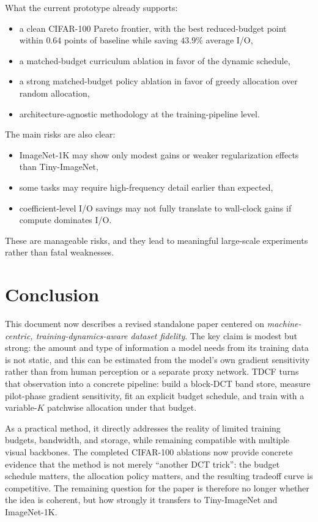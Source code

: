 \documentclass[10pt,twocolumn]{article}
\begin{document}
What the current prototype already supports:
\begin{itemize}
    \item a clean CIFAR-100 Pareto frontier, with the best reduced-budget point within $0.64$ points of baseline while saving $43.9\%$ average I/O,
    \item a matched-budget curriculum ablation in favor of the dynamic schedule,
    \item a strong matched-budget policy ablation in favor of greedy allocation over random allocation,
    \item architecture-agnostic methodology at the training-pipeline level.
\end{itemize}

The main risks are also clear:
\begin{itemize}
    \item ImageNet-1K may show only modest gains or weaker regularization effects than Tiny-ImageNet,
    \item some tasks may require high-frequency detail earlier than expected,
    \item coefficient-level I/O savings may not fully translate to wall-clock gains if compute dominates I/O.
\end{itemize}
These are manageable risks, and they lead to meaningful large-scale experiments rather than fatal weaknesses.

\section{Conclusion}
This document now describes a revised standalone paper centered on \emph{machine-centric, training-dynamics-aware dataset fidelity}. The key claim is modest but strong: the amount and type of information a model needs from its training data is not static, and this can be estimated from the model's own gradient sensitivity rather than from human perception or a separate proxy network. TDCF turns that observation into a concrete pipeline: build a block-DCT band store, measure pilot-phase gradient sensitivity, fit an explicit budget schedule, and train with a variable-$K$ patchwise allocation under that budget.

As a practical method, it directly addresses the reality of limited training budgets, bandwidth, and storage, while remaining compatible with multiple visual backbones. The completed CIFAR-100 ablations now provide concrete evidence that the method is not merely ``another DCT trick'': the budget schedule matters, the allocation policy matters, and the resulting tradeoff curve is competitive. The remaining question for the paper is therefore no longer whether the idea is coherent, but how strongly it transfers to Tiny-ImageNet and ImageNet-1K.
\end{document}
